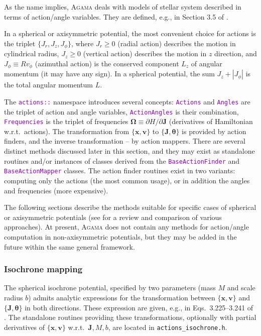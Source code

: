 \documentclass[12pt]{article}
\newcommand{\Agama}{\textsc{Agama}\xspace}
\newcommand{\ttt}[1]{\textcolor{darkviolet}{\texttt{#1}}}
\renewcommand{\d}{\partial}
\newcommand{\bv}{\boldsymbol{v}}
\newcommand{\bx}{\boldsymbol{x}}
\newcommand{\bJ}{\boldsymbol{J}}
\newcommand{\bt}{\boldsymbol{\theta}}
\begin{document}
As the name implies, \Agama deals with models of stellar system described in terms of action/angle variables. They are defined, e.g., in Section 3.5 of \cite{BinneyTremaine}.

In a spherical or axisymmetric potential, the most convenient choice for actions is the triplet $\{J_r, J_z, J_\phi\}$, where $J_r\ge 0$ (radial action) describes the motion in cylindrical radius, $J_z\ge 0$ (vertical action) describes the motion in $z$ direction, and $J_\phi \equiv R v_\phi$ (azimuthal action) is the conserved component $L_z$ of angular momentum (it may have any sign). In a spherical potential, the sum $J_z + |J_\phi|$ is the total angular momentum $L$.

The \ttt{actions::} namespace introduces several concepts: \ttt{Actions} and \ttt{Angles} are the triplet of action and angle variables, \ttt{ActionAngles} is their combination, \ttt{Frequencies} is the triplet of frequencies $\boldsymbol{\Omega}\equiv \d H/\d\bJ$ (derivatives of Hamiltonian w.r.t.\ actions). 
The transformation from $\{\bx,\bv\}$ to $\{\bJ,\bt\}$ is provided by action finders, and the inverse transformation -- by action mappers. There are several distinct methods discussed later in this section, and they may exist as standalone routines and/or instances of classes derived from the \ttt{BaseActionFinder} and \ttt{BaseActionMapper} classes. The action finder routines exist in two variants: computing only the actions (the most common usage), or in addition the angles and frequencies (more expensive).

The following sections describe the methods suitable for specific cases of spherical or axisymmetric potentials (see \cite{SandersBinney2016} for a review and comparison of various approaches).
At present, \Agama does not contain any methods for action/angle computation in non\--axi\-sym\-met\-ric potentials, but they may be added in the future within the same general framework.

\subsubsection{Isochrone mapping}  \label{sec:ActionsIsochrone}

The spherical isochrone potential, specified by two parameters (mass $M$ and scale radius $b$) admits analytic expressions for the transformation between $\{\bx,\bv\}$ and $\{\bJ,\bt\}$ in both directions. These expression are given, e.g., in Eqs.~3.225--3.241 of \cite{BinneyTremaine}.
The standalone routines providing these transformations, optionally with partial derivatives of $\{\bx,\bv\}$ w.r.t.\ $\bJ, M, b$, are located in \texttt{actions_isochrone.h}.
\end{document}
